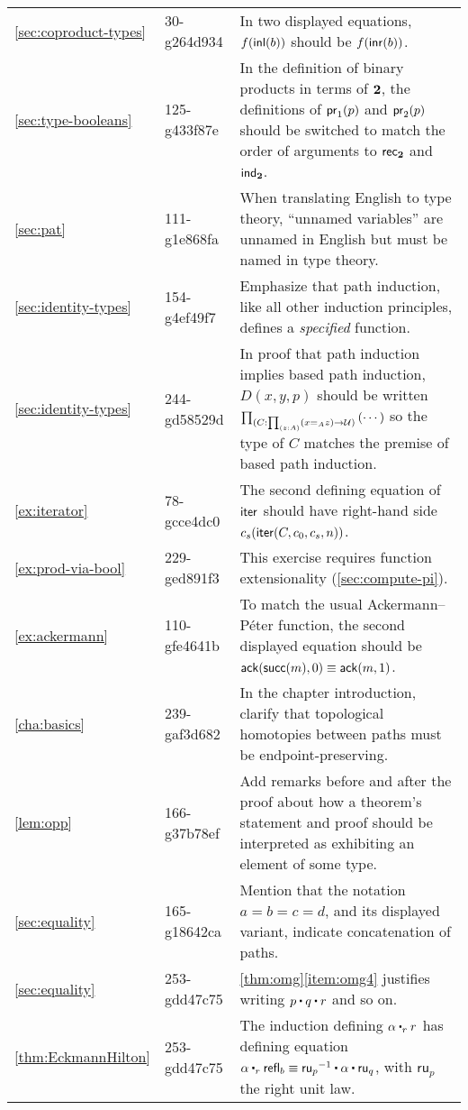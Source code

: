 \documentclass[
%
%
11pt %
]{article}
\newcounter{chapter}            %
\begin{document}
\begin{longtable}{llp{10.5cm}}
  \autoref{sec:coproduct-types}
  & 30-g264d934
  & In two displayed equations, $f({\mathsf{inl}}(b))$ should be $f({\mathsf{inr}}(b))$.\\
  \autoref{sec:type-booleans}
  & 125-g433f87e
  & In the definition of binary products in terms of $\mathbf{2}$, the definitions of $\mathsf{pr}_{1}(p)$ and $\mathsf{pr}_{2}(p)$ should be switched to match the order of arguments to $\mathsf{rec}_{\mathbf{2}}$ and $\mathsf{ind}_{\mathbf{2}}$.\\
  \autoref{sec:pat}
  & 111-g1e868fa
  & When translating English to type theory, ``unnamed variables'' are unnamed in English but must be named in type theory.\\
  \autoref{sec:identity-types}
  & 154-g4ef49f7
  & Emphasize that path induction, like all other induction principles, defines a \emph{specified} function.\\
  \autoref{sec:identity-types}
  & 244-gd58529d
  & In proof that path induction implies based path induction, $D(x,y,p)$ should be written $\prd{C : \prd{z:A} (\id[A]{x}{z}) \to \UU} \left( \cdots \right)$ so the type of $C$ matches the premise of based path induction. \\
  \autoref{ex:iterator}
  & 78-gcce4dc0
  & The second defining equation of $\mathsf{iter}$ should have right-hand side $c_s(\mathsf{iter}(C,c_0,c_s,n))$.\\
  \autoref{ex:prod-via-bool}
  & 229-ged891f3
  & This exercise requires function extensionality (\autoref{sec:compute-pi}).\\
  \autoref{ex:ackermann}
  & 110-gfe4641b
  & To match the usual Ackermann--P\'eter function, the second displayed equation should be $\mathsf{ack}(\mathsf{succ}(m),0) \equiv \mathsf{ack}(m,1)$.\\
  \autoref{cha:basics}
  & 239-gaf3d682
  & In the chapter introduction, clarify that topological homotopies between paths must be endpoint-preserving.\\
  \autoref{lem:opp}
  & 166-g37b78ef
  & Add remarks before and after the proof about how a theorem's statement and proof should be interpreted as exhibiting an element of some type.\\
  \autoref{sec:equality}
  & 165-g18642ca
  & Mention that the notation $a=b=c=d$, and its displayed variant, indicate concatenation of paths.\\
  \autoref{sec:equality}
  & 253-gdd47c75
  & \autoref{thm:omg}\ref{item:omg4} justifies writing $p\ct q \ct r$ and so on.\\
  \autoref{thm:EckmannHilton}
  & 253-gdd47c75
  & The induction defining $\alpha\rightwhisker r$ has defining equation $\alpha \rightwhisker \refl{b} \jdeq \opp{\mathsf{ru}_p} \ct \alpha \ct \mathsf{ru}_q$, with $\mathsf{ru}_p$ the right unit law.

\end{longtable}
\end{document}
